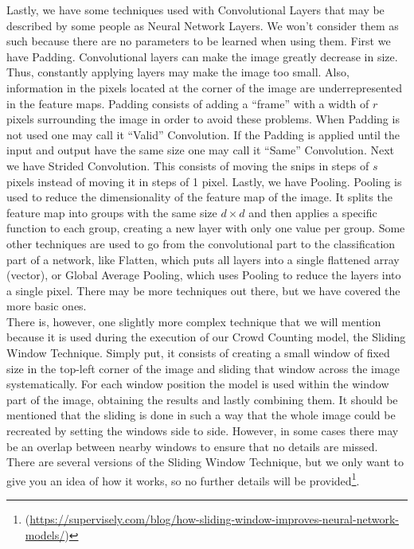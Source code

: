 Lastly, we have some techniques used with Convolutional Layers that may be described by some people as Neural Network Layers. We won't consider them as such because there are no parameters to be learned when using them. First we have Padding. Convolutional layers can make the image greatly decrease in size. Thus, constantly applying layers may make the image too small. Also, information in the pixels located at the corner of the image are underrepresented in the feature maps. Padding consists of adding a ``frame'' with a width of $r$ pixels surrounding the image in order to avoid these problems. When Padding is not used one may call it ``Valid'' Convolution. If the Padding is applied until the input and output have the same size one may call it ``Same'' Convolution. Next we have Strided Convolution. This consists of moving the snips in steps of $s$ pixels instead of moving it in steps of 1 pixel. Lastly, we have Pooling. Pooling is used to reduce the dimensionality of the feature map of the image. It splits the feature map into groups with the same size $d \times d$ and then applies a specific function to each group, creating a new layer with only one value per group. Some other techniques are used to go from the convolutional part to the classification part of a network, like Flatten, which puts all layers into a single flattened array (vector), or Global Average Pooling, which uses Pooling to reduce the layers into a single pixel. There may be more techniques out there, but we have covered the more basic ones.\\

There is, however, one slightly more complex technique that we will mention because it is used during the execution of our Crowd Counting model, the Sliding Window Technique. Simply put, it consists of creating a small window of fixed size in the top-left corner of the image and sliding that window across the image systematically. For each window position the model is used within the window part of the image, obtaining the results and lastly combining them. It should be mentioned that the sliding is done in such a way that the whole image could be recreated by setting the windows side to side. However, in some cases there may be an overlap between nearby windows to ensure that no details are missed. There are several versions of the Sliding Window Technique, but we only want to give you an idea of how it works, so no further details will be provided\footnote{(\url{https://supervisely.com/blog/how-sliding-window-improves-neural-network-models/})}.\\ %


